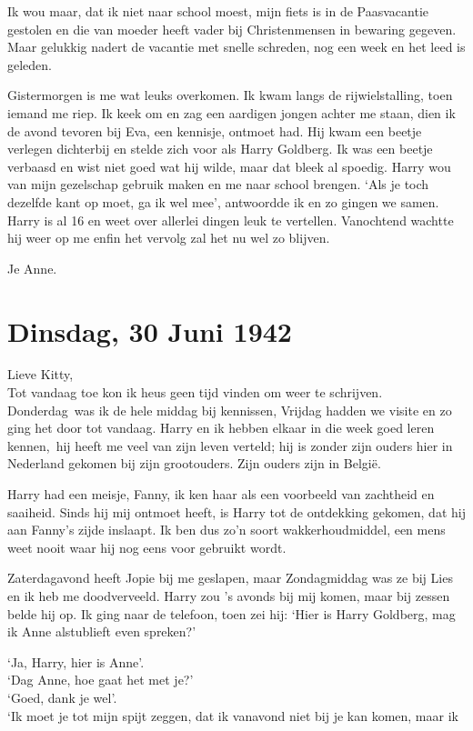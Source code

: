 \documentclass{book}
\begin{document}
Ik wou maar, dat ik niet naar school moest, mijn fiets is in de Paasvacantie
gestolen en die van moeder heeft vader bij Christenmensen in bewaring gegeven.
Maar gelukkig nadert de vacantie met snelle schreden, nog een week en het leed
is geleden.

Gistermorgen is me wat leuks overkomen. Ik kwam langs de rijwielstalling, toen
iemand me riep. Ik keek om en zag een aardigen jongen achter me staan, dien ik
de avond tevoren bij Eva, een kennisje, ontmoet had. Hij kwam een beetje
verlegen dichterbij en stelde zich voor als Harry Goldberg. Ik was een beetje
verbaasd en wist niet goed wat hij wilde, maar dat bleek al spoedig. Harry wou
van mijn gezelschap gebruik maken en me naar school brengen. `Als je toch
dezelfde kant op moet, ga ik wel mee', antwoordde ik en zo gingen we samen.
Harry is al 16 en weet over allerlei dingen leuk te vertellen. Vanochtend
wachtte hij weer op me enfin het vervolg zal het nu wel zo blijven.

Je Anne.

\section*{Dinsdag, 30 Juni 1942}

Lieve Kitty,\\
Tot vandaag toe kon ik heus geen tijd vinden om weer te
schrijven. Donderdag~was ik de hele middag bij kennissen, Vrijdag hadden we
visite en zo ging het door tot vandaag. Harry en ik hebben elkaar in die week
goed leren kennen,~hij heeft me veel van zijn leven verteld; hij is zonder zijn
ouders hier in Nederland gekomen bij zijn grootouders. Zijn ouders zijn in
België.

Harry had een meisje, Fanny, ik ken haar als een voorbeeld van zachtheid en
saaiheid. Sinds hij mij ontmoet heeft, is Harry tot de ontdekking gekomen, dat
hij aan Fanny's zijde inslaapt. Ik ben dus zo'n soort wakkerhoudmiddel, een mens
weet nooit waar hij nog eens voor gebruikt wordt.

Zaterdagavond heeft Jopie bij me geslapen, maar Zondagmiddag was ze bij Lies en
ik heb me doodverveeld. Harry zou 's avonds bij mij komen, maar bij zessen belde
hij op. Ik ging naar de telefoon, toen zei hij: `Hier is Harry Goldberg, mag ik
Anne alstublieft even spreken?'

`Ja, Harry, hier is Anne'.\\
`Dag Anne, hoe gaat het met je?'\\
`Goed, dank je
wel'.\\
`Ik moet je tot mijn spijt zeggen, dat ik vanavond niet bij je kan
komen, maar ik
\end{document}
